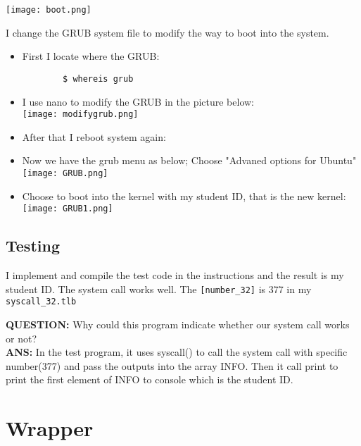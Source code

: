 \documentclass[a4paper, 11pt]{article}
\begin{document}
\texttt{[image: boot.png]}
\bigbreak

\par{I change the GRUB system file to modify the way to boot into the system.}
\begin{itemize}
    \item First I locate where the GRUB:
    \begin{verbatim}
        $ whereis grub
    \end{verbatim}
    \item I use nano to modify the GRUB in the picture below: \\
    \texttt{[image: modifygrub.png]}
    \bigbreak

    \item After that I reboot system again:
    \item Now we have the grub menu as below; Choose "Advaned options for Ubuntu" \\
    \texttt{[image: GRUB.png]}
    \bigbreak
    
    \item Choose to boot into the kernel with my student ID, that is the new kernel: \\
    \texttt{[image: GRUB1.png]}
    \bigbreak
\end{itemize}

\subsection{Testing}

\par{I implement and compile the test code in the instructions and the result is my student ID. The system call works well. The \texttt{[number\_32]} is 377 in my \texttt{syscall\_32.tlb}}

\textbf{QUESTION:} Why could this program indicate whether our system call works or not? \\
\textbf{ANS:} In the test program, it uses syscall() to call the system call with specific number(377) and pass the outputs into the array INFO. Then it call print to print the first element of INFO to console which is the student ID.

\newpage

\section{Wrapper}
\end{document}
